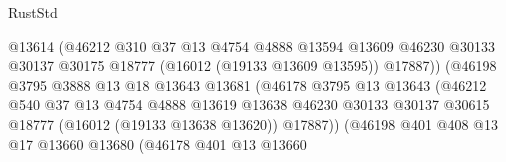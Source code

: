 \begin{lexlean}{RustStd}
\begin{coremodule}
                                        @13614
                                        (@46212
                                          @310
                                          @37
                                          @13
                                          @4754
                                          @4888
                                          @13594
                                          @13609
                                          @46230
                                          @30133
                                          @30137
                                          @30175
                                          @18777
                                          (@16012 (@19133 @13609 @13595))
                                          @17887))
                                      (@46198
                                        @3795
                                        @3888
                                        @13
                                        @18
                                        @13643
                                        @13681
                                        (@46178
                                          @3795
                                          @13
                                          @13643
                                          (@46212
                                            @540
                                            @37
                                            @13
                                            @4754
                                            @4888
                                            @13619
                                            @13638
                                            @46230
                                            @30133
                                            @30137
                                            @30615
                                            @18777
                                            (@16012 (@19133 @13638 @13620))
                                            @17887))
                                        (@46198
                                          @401
                                          @408
                                          @13
                                          @17
                                          @13660
                                          @13680
                                          (@46178
                                            @401
                                            @13
                                            @13660

\end{coremodule}
\end{lexlean}
